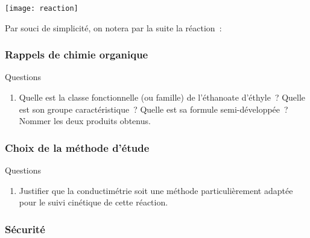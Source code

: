 \documentclass[a4paper, 11pt, final, garamond]{book}
\begin{document}
      \begin{center}
        \texttt{[image: reaction]}
      \end{center} 
      
Par souci de simplicité, on notera par la suite la réaction~: \hfill
{}

\vspace{-10pt}
\subsubsection{Rappels de chimie organique}

\vspace{-10pt}
\begin{rexem}{\tiny Questions}
    \begin{enumerate}[label*=\sqenumi]
        \item Quelle est la classe fonctionnelle (ou famille) de l'éthanoate
            d'éthyle~? Quelle est son groupe caractéristique~? Quelle est sa formule
            semi-développée~? Nommer les deux produits obtenus.
    \end{enumerate}
\end{rexem}

\vspace{-10pt}
\subsubsection{Choix de la méthode d'étude}

\vspace{-10pt}
\begin{rexem}{\tiny Questions}
    \begin{enumerate}[label*=\sqenumi, start=2]
        \item Justifier que la conductimétrie soit une méthode particulièrement
            adaptée pour le suivi cinétique de cette réaction.
    \end{enumerate}
\end{rexem}

\vspace{-10pt}
\subsubsection{Sécurité}
\end{document}
